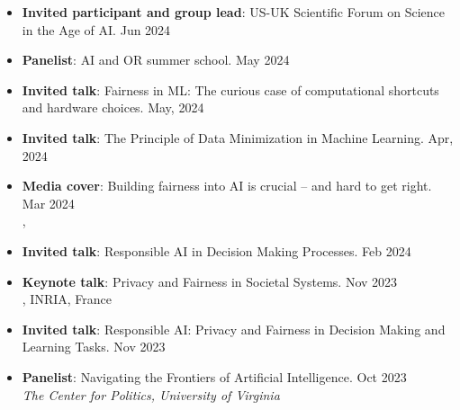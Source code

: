\begin{itemize}
  \item {\bf Invited participant and group lead}: 
  {US-UK Scientific Forum on Science in the Age of AI.} \hfill{Jun 2024}\\

  \item {\bf Panelist}: {AI and OR summer school.} \hfill{May 2024}\\

  \item {\bf Invited talk}: Fairness in ML: The curious case of computational shortcuts and hardware choices. \hfill{May, 2024}\\

  \item {\bf Invited talk}: The Principle of Data Minimization in Machine Learning. \hfill{Apr, 2024}\\
  {}

  \item {\bf Media cover}: 
  {Building fairness into AI is crucial – and hard to get right.} \hfill {Mar 2024} \\
  , 

  \item {\bf Invited talk}: Responsible AI in Decision Making Processes. \hfill{Feb 2024}\\
  {}
  
  \item {\bf Keynote talk}: {Privacy and Fairness in Societal Systems.} \hfill{Nov 2023}\\
  {, INRIA, France}

  \item {\bf Invited talk}: {Responsible AI: Privacy and Fairness in Decision Making and Learning Tasks.} \hfill{Nov 2023}\\
  {}

  \item {\bf Panelist}: {Navigating the Frontiers of Artificial Intelligence.} \hfill{Oct 2023}\\
  {\em  The Center for Politics, University of Virginia}


\end{itemize}
